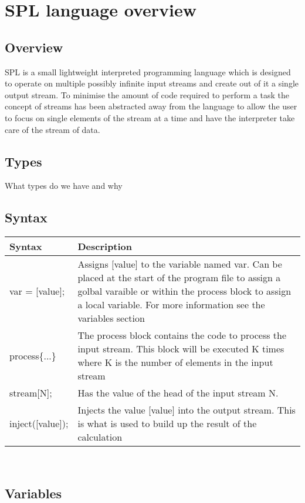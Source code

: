 \documentclass[11pt,a4paper,oneside]{report}
\begin{document}
\section*{SPL language overview}

\subsection*{Overview}

SPL is a small lightweight interpreted programming language which is designed to operate on multiple possibly infinite input streams and create out of it a single output stream. To minimise the amount of code required to perform a task the concept of streams has been abstracted away from the language to allow the user to focus on single elements of the stream at a time and have the interpreter take care of the stream of data.

\subsection*{Types}

What types do we have and why

\subsection*{Syntax}


\begin{center}
\begin{tabular}{ l | p{10cm} }
 Syntax  &  Description \\
\hline
 var = [value]; & Assigns [value] to the variable named var. Can be placed at the start of the program file to assign a golbal varaible or within the process block to assign a local variable. For more information see the variables section\\ \hline
 process\{...\} & The process block contains the code to process the input stream. This block will be executed K times where K is the number of elements in the input stream \\ \hline
 stream[N]; & Has the value of the head of the input stream N. \\ \hline
 inject([value]); & Injects the value [value] into the output stream. This is what is used to build up the result of the calculation \\
\end{tabular}
\
\end{center}

\subsection*{Variables}
\end{document}
